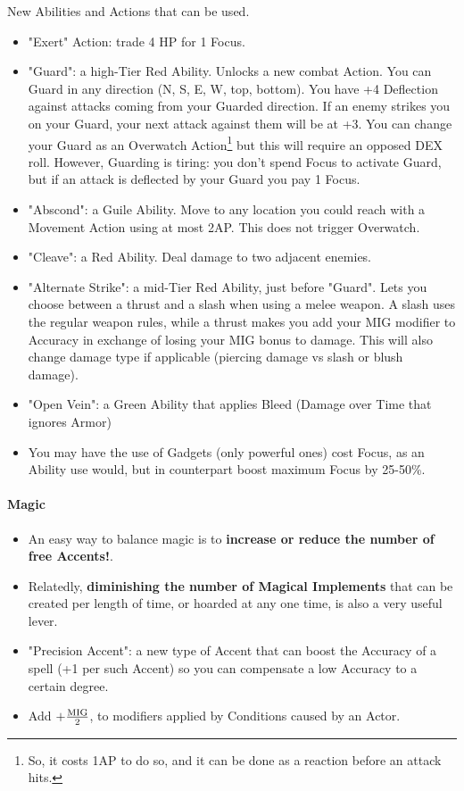 New Abilities and Actions that can be used.

\begin{itemize}
    \item "Exert" Action: trade 4 HP for 1 Focus.
    \item "Guard": a high-Tier Red Ability. Unlocks a new combat Action. You can Guard in any direction (N, S, E, W, top, bottom). You have +4 Deflection against attacks coming from your Guarded direction. If an enemy strikes you on your Guard, your next attack against them will be at +3. You can change your Guard as an Overwatch Action\footnote{So, it costs 1AP to do so, and it can be done as a reaction before an attack hits.} but this will require an opposed DEX roll. However, Guarding is tiring: you don't spend Focus to activate Guard, but if an attack is deflected by your Guard you pay 1 Focus.
    \item "Abscond": a Guile Ability. Move to any location you could reach with a Movement Action using at most 2AP. This does not trigger Overwatch.
    \item "Cleave": a Red Ability. Deal damage to two adjacent enemies.
    \item "Alternate Strike": a mid-Tier Red Ability, just before "Guard". Lets you choose between a thrust and a slash when using a melee weapon. A slash uses the regular weapon rules, while a thrust makes you add your MIG modifier to Accuracy in exchange of losing your MIG bonus to damage. This will also change damage type if applicable (piercing damage vs slash or blush damage).
    \item "Open Vein": a Green Ability that applies Bleed (Damage over Time that ignores Armor)
    \item You may have the use of Gadgets (only powerful ones) cost Focus, as an Ability use would, but in counterpart boost maximum Focus by 25-50\%.
\end{itemize}

\paragraph{Magic}

\begin{itemize}
    \item An easy way to balance magic is to \textbf{increase or reduce the number of free Accents!}.
    \item Relatedly, \textbf{diminishing the number of Magical Implements} that can be created per length of time, or hoarded at any one time, is also a very useful lever.
    \item "Precision Accent": a new type of Accent that can boost the Accuracy of a spell (+1 per such Accent) so you can compensate a low Accuracy to a certain degree.
    \item Add $+\frac{\textup{MIG}}{2}$, to modifiers applied by Conditions caused by an Actor.
\end{itemize}


